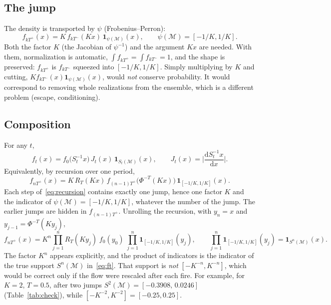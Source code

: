 \documentclass[11pt,a4paper]{article}
\theoremstyle{remark}
\newcommand{\M}{\mathcal{M}}
\newcommand{\one}{\mathbf{1}}
\newcommand{\dd}{\mathrm{d}}
\begin{document}
\subsection{The jump}
The density is transported by $\psi$ (Frobenius--Perron):
\begin{equation}\label{eq:jump}
  f_{kT^+}(x) = K\, f_{kT^-}(Kx)\,\one_{\psi(\M)}(x),
  \qquad \psi(\M)=[-1/K,1/K].
\end{equation}
Both the factor $K$ (the Jacobian of $\psi^{-1}$) and the argument $Kx$ are
needed. With them, normalization is automatic,
$\int f_{kT^+}=\int f_{kT^-}=1$, and the shape is preserved: $f_{kT^+}$ is
$f_{kT^-}$ squeezed into $[-1/K,1/K]$. Simply multiplying by $K$ and cutting,
$K f_{kT^-}(x)\one_{\psi(\M)}(x)$, would \emph{not} conserve probability. It
would correspond to removing whole realizations from the ensemble, which is a
different problem (escape, conditioning).

\subsection{Composition}
For any $t$,
\begin{equation}\label{eq:ft}
  f_t(x) = f_0\big(S_t^{-1}x\big)\, J_t(x)\, \one_{S_t(\M)}(x),
  \qquad J_t(x)=\Big|\frac{\dd S_t^{-1}x}{\dd x}\Big| .
\end{equation}
Equivalently, by recursion over one period,
\begin{equation}\label{eq:recursion}
  f_{nT^+}(x) = K\, R_T(Kx)\, f_{(n-1)T^+}\big(\Phi^{-T}(Kx)\big)\,
  \one_{[-1/K,1/K]}(x).
\end{equation}
Each step of~\eqref{eq:recursion} contains exactly one jump, hence one factor
$K$ and the indicator of $\psi(\M)=[-1/K,1/K]$, whatever the number of the
jump. The earlier jumps are hidden in $f_{(n-1)T^+}$. Unrolling the recursion,
with $y_n=x$ and $y_{j-1}=\Phi^{-T}(Ky_j)$,
\begin{equation}\label{eq:unrolled}
  f_{nT^+}(x) = K^n \prod_{j=1}^{n} R_T(Ky_j)\; f_0(y_0)\;
  \prod_{j=1}^{n}\one_{[-1/K,1/K]}(y_j),
  \qquad
  \prod_{j=1}^{n}\one_{[-1/K,1/K]}(y_j) = \one_{S^n(\M)}(x).
\end{equation}
The factor $K^n$ appears explicitly, and the product of indicators is the
indicator of the true support $S^n(\M)$ in~\eqref{eq:ft}. That support is
\emph{not} $[-K^{-n},K^{-n}]$, which would be correct only if the flow were
rescaled after each fire. For example, for $K=2$, $T=0.5$, after two jumps
$S^2(\M)=[-0.3908,\,0.0246]$ (Table~\ref{tab:check}), while
$[-K^{-2},K^{-2}]=[-0.25,0.25]$.
\end{document}
